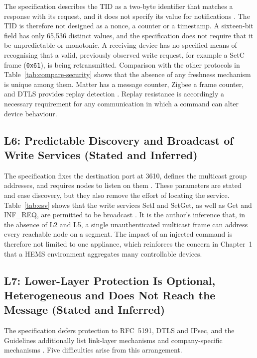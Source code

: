The specification describes the TID as a two-byte identifier that matches a response with its request, and it does not specify its value for notifications \cite{ECHONETPart2}. The TID is therefore not designed as a nonce, a counter or a timestamp. A sixteen-bit field has only 65{,}536 distinct values, and the specification does not require that it be unpredictable or monotonic. A receiving device has no specified means of recognising that a valid, previously observed write request, for example a SetC frame (\texttt{0x61}), is being retransmitted. Comparison with the other protocols in Table~\ref{tab:compare-security} shows that the absence of any freshness mechanism is unique among them. Matter has a message counter, Zigbee a frame counter, and DTLS provides replay detection \cite{Zohdi2026,SiliconLabsZigbee,RFC6347}. Replay resistance is accordingly a necessary requirement for any communication in which a command can alter device behaviour.

\subsection{L6: Predictable Discovery and Broadcast of Write Services (Stated and Inferred)}

The specification fixes the destination port at 3610, defines the multicast group addresses, and requires nodes to listen on them \cite{ECHONETPart2}. These parameters are stated and ease discovery, but they also remove the effort of locating the service. Table~\ref{tab:esv} shows that the write services SetI and SetGet, as well as Get and INF\_REQ, are permitted to be broadcast \cite{ECHONETPart2}. It is the author's inference that, in the absence of L2 and L5, a single unauthenticated multicast frame can address every reachable node on a segment. The impact of an injected command is therefore not limited to one appliance, which reinforces the concern in Chapter~1 that a HEMS environment aggregates many controllable devices.

\subsection{L7: Lower-Layer Protection Is Optional, Heterogeneous and Does Not Reach the Message (Stated and Inferred)}

The specification defers protection to RFC~5191, DTLS and IPsec, and the Guidelines additionally list link-layer mechanisms and company-specific mechanisms \cite{ECHONETPart2,ECHONETGuidelines}. Five difficulties arise from this arrangement.


